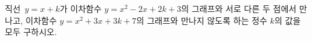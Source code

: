 직선~$y=x+k$가 이차함수 $y=x^2-2x+2k+3$의 그래프와 서로 다른 두 점에서 만나고, 이차함수 $y=x^2+3x+3k+7$의 그래프와 만나지 않도록 하는 정수 $k$의 값을 모두 구하시오.
